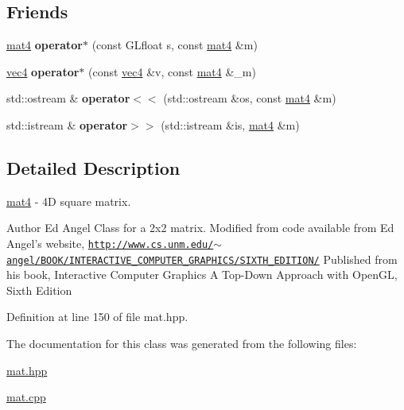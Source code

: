\subsection*{Friends}
\begin{DoxyCompactItemize}
\item 
\hypertarget{class_angel_1_1mat4_aee74ba4512e3c59e8ed73764e4396d59}{\hyperlink{class_angel_1_1mat4}{mat4} {\bfseries operator$\ast$} (const G\-Lfloat s, const \hyperlink{class_angel_1_1mat4}{mat4} \&m)}\label{class_angel_1_1mat4_aee74ba4512e3c59e8ed73764e4396d59}

\item 
\hypertarget{class_angel_1_1mat4_a43eac2e676368c54279c3babf511fa6b}{\hyperlink{struct_angel_1_1vec4}{vec4} {\bfseries operator$\ast$} (const \hyperlink{struct_angel_1_1vec4}{vec4} \&v, const \hyperlink{class_angel_1_1mat4}{mat4} \&\-\_\-m)}\label{class_angel_1_1mat4_a43eac2e676368c54279c3babf511fa6b}

\item 
\hypertarget{class_angel_1_1mat4_ac079e857a3c74a1b974e4f4619e16adf}{std\-::ostream \& {\bfseries operator$<$$<$} (std\-::ostream \&os, const \hyperlink{class_angel_1_1mat4}{mat4} \&m)}\label{class_angel_1_1mat4_ac079e857a3c74a1b974e4f4619e16adf}

\item 
\hypertarget{class_angel_1_1mat4_a897b946d3a30dbddc811d486bfa4b61a}{std\-::istream \& {\bfseries operator$>$$>$} (std\-::istream \&is, \hyperlink{class_angel_1_1mat4}{mat4} \&m)}\label{class_angel_1_1mat4_a897b946d3a30dbddc811d486bfa4b61a}

\end{DoxyCompactItemize}


\subsection{Detailed Description}
\hyperlink{class_angel_1_1mat4}{mat4} -\/ 4\-D square matrix. 

\begin{DoxyAuthor}{Author}
Ed Angel Class for a 2x2 matrix. Modified from code available from Ed Angel's website, \href{http://www.cs.unm.edu/~angel/BOOK/INTERACTIVE_COMPUTER_GRAPHICS/SIXTH_EDITION/}{\tt http\-://www.\-cs.\-unm.\-edu/$\sim$angel/\-B\-O\-O\-K/\-I\-N\-T\-E\-R\-A\-C\-T\-I\-V\-E\-\_\-\-C\-O\-M\-P\-U\-T\-E\-R\-\_\-\-G\-R\-A\-P\-H\-I\-C\-S/\-S\-I\-X\-T\-H\-\_\-\-E\-D\-I\-T\-I\-O\-N/} Published from his book, Interactive Computer Graphics A Top-\/\-Down Approach with Open\-G\-L, Sixth Edition 
\end{DoxyAuthor}


Definition at line 150 of file mat.\-hpp.



The documentation for this class was generated from the following files\-:\begin{DoxyCompactItemize}
\item 
\hyperlink{mat_8hpp}{mat.\-hpp}\item 
\hyperlink{mat_8cpp}{mat.\-cpp}\end{DoxyCompactItemize}
